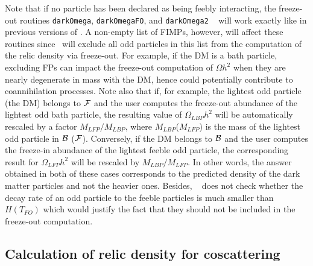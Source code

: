 \documentclass[12pt,a4paper]{article}
\begin{document}
Note that if no particle has been declared as being feebly interacting, the freeze-out routines \verb|darkOmega|, \verb|darkOmegaFO|, and \verb|darkOmega2| ~\cite{Belanger:2014vza} will work exactly like in previous versions of \micro. A non-empty list of FIMPs, however, will affect these routines since \micro~will exclude all odd particles in this list from the computation of the relic density via freeze-out. For example, if the DM is a bath particle, excluding FPs can impact the freeze-out computation of $\Omega h^2$ when they are nearly degenerate in mass with the DM, hence could potentially contribute to coannihilation processes. Note also that if, for example, the lightest odd particle (the DM) belongs to ${\cal F}$ and the user computes the freeze-out abundance of the lightest odd bath particle, the resulting  value of $\Omega_{LBP} h^2$  will be automatically rescaled by a factor $M_{LFP}/M_{LBP}$, where $M_{LBP}$($M_{LFP}$) is the mass of the lightest odd particle in ${\cal B}$ (${\cal F}$). Conversely, if the DM belongs to ${\cal B}$ and the user computes the freeze-in abundance of the lightest feeble odd particle, the corresponding result for $\Omega_{LFP} h^2$ will be rescaled by $M_{LBP}/M_{LFP}$. In other words, the answer obtained in both of these cases corresponds to the predicted density of the dark matter particles and not the heavier ones. Besides, \micro~ does not check whether the decay rate of an odd particle to the feeble particles is much smaller than $H(T_{FO})$ which would justify the fact that they should not be included in the freeze-out computation.

\subsection{Calculation of relic density for coscattering}
\label{sec:routines} 
\end{document}
